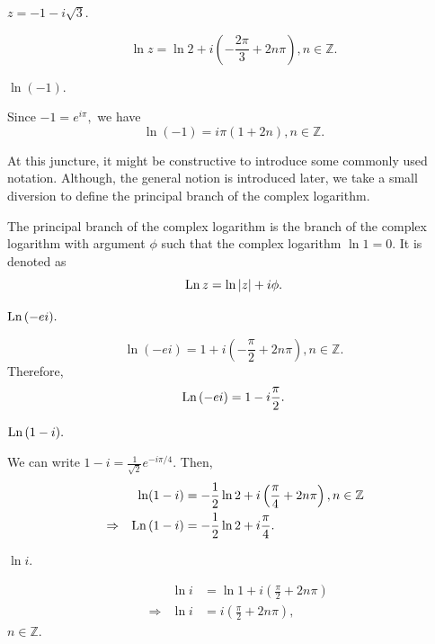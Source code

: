 \documentclass[12pt]{book}
\begin{document}
\begin{exmp}
    $z = -1 - i\sqrt{3}.$
\end{exmp}
\[
    \ln z = \ln 2 + i\left(-\frac{2\pi}{3} + 2n\pi\right), n \in \mathbb{Z}.
\]

\begin{exmp}
    $\ln(-1).$
\end{exmp}
Since $-1 = e^{i\pi},$ we have
\[
    \ln(-1) = i\pi\left(1 + 2n\right), n \in \mathbb{Z}.
\]

At this juncture, it might be constructive to introduce some commonly used notation. Although, the general notion is introduced later, we take a small diversion to define the principal branch of the complex logarithm.
\begin{defn}
   The principal branch of the complex logarithm is the branch of the complex logarithm with argument $\phi$ such that the complex logarithm $\ln 1 = 0.$ It is denoted as 
   \[
        \text{Ln}\, z = \ln \left\lvert z \right\rvert + i\phi.
    \]
\end{defn}

\begin{exmp}
    $\text{Ln}\, (-ei).$
\end{exmp}
\[
    \ln (-ei) = 1 + i\left(-\frac{\pi}{2} + 2n\pi\right), n \in \mathbb{Z}.
\]
Therefore, 
\[
    \text{Ln}\, (-ei) = 1 - i\frac{\pi}{2}.
\]

\begin{exmp}
    $\text{Ln}\, (1 - i).$
\end{exmp}
We can write $1 - i = \frac{1}{\sqrt{2}} e^{-i\pi / 4}.$ Then,
\begin{align*}
    &&\ln (1 -  i) 
        &= 
            -\frac{1}{2}\ln 2  + i\left(\frac{\pi}{4} + 2n\pi\right), n \in \mathbb{Z} \\
    &\Rightarrow &\text{Ln}\, (1 - i)
        &=
            -\frac{1}{2}\ln 2  + i\frac{\pi}{4}. \\
\end{align*}

\begin{exmp}
    $\ln i.$
\end{exmp}

\begin{align*}
    &&\ln i 
        &= 
            \ln 1 + i\left(\frac{\pi}{2} + 2n\pi\right) \\
    &\Rightarrow &\ln i
        &=
        i\left(\frac{\pi}{2} + 2n\pi\right),
\end{align*}
$n \in \mathbb{Z}.$
\end{document}
